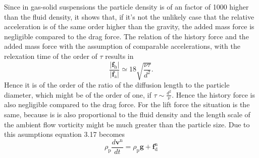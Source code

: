 \documentclass[a4paper,12pt]{article}
\renewcommand*\vec[1]{\boldsymbol{#1}}
\numberwithin{equation}{section} %
\begin{document}
Since in gas-solid suspensions the particle density is of an factor of 1000 higher than the fluid density, it shows that, if it's not the unlikely case that the relative acceleration is of the same order higher than the gravity, the added mass force is negligible compared to the drag force.
The relation of the history force and the added mass force with the assumption of comparable accelerations, with the relexation time of the order of $\tau$ results in
\begin {equation}
\frac{|\vec{f}_\mathrm{h}|}{|\vec{f}_\mathrm{a}|}\simeq 18 \sqrt{\frac{\nu\tau}{d^\mathrm{2}}}.
\end{equation}
Hence it is of the order of the ratio of the diffusion length to the particle diameter, which might be of the order of one, if $\tau \sim \frac{d^\mathrm{2}}{\nu}$.
Hence the history force is also negligible compared to the drag force.
For the lift force the situation is the same, because is is also proportional to the fluid density and the length scale of the ambient flow vorticity might be much greater than the particle size.
Due to this asumptions equation 3.17 becomes
\begin{equation}
\rho_\mathrm{p}\frac{d\vec{v}^\mathrm{n}}{dt} = \rho_\mathrm{p}\vec{g}+\vec{f}_\mathrm{d}^\mathrm{n}
\end{equation}
\end{document}
